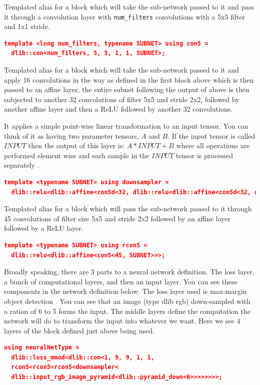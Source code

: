 \documentclass[a4paper, 12pt, oneside]{report}
\begin{document}
  Templated alias for a block which will take the sub-network passed to 
  it and pass it through a convolution layer with \texttt{num_filters} convolutions 
  with a 5x5 filter and 1x1 stride.
  
  \begin{lstlisting}[language=json,firstnumber=1]
  template <long num_filters, typename SUBNET> using con5 = 
  dlib::con<num_filters, 5, 5, 1, 1, SUBNET>;
  \end{lstlisting}
  
  Templated alias for a block which will take the sub-network passed to it
  and apply 16 convolutions in the way as defined in the first block above
  which is then passed to an affine layer, the entire subnet following the 
  output of above is then subjected to another 32 convolutions of filter 
  5x5 and stride 2x2, followed by another affine layer and then a ReLU \cite{RectifierneuralnetworksWikipedia-2020-02-10} 
  followed by another 32 convolutions.  
  
  It applies a simple point-wise linear transformation to an input tensor.  
  You can think of it as having two parameter tensors, $A$ and $B$.  If the 
  input tensor is called $INPUT$ then the output of this layer is:
  $A*INPUT+B$
  where all operations are performed element wise and each sample in the
  $INPUT$ tensor is processed separately \cite{dlibCLibrarylayersabstracth-2019-12-14}.
  
  \begin{lstlisting}[language=json,firstnumber=1]
  template <typename SUBNET> using downsampler = 
  dlib::relu<dlib::affine<con5d<32, dlib::relu<dlib::affine<con5d<32, dlib::relu<dlib::affine<con5d<16, SUBNET>>>>>>>>>;
  \end{lstlisting}
 
  Templated alias for a block which will pass the sub-network passed to it
  through 45 convolutions of filter size 5x5 and stride 2x2 followed 
  by an affine layer followed by a ReLU layer.
  \begin{lstlisting}[language=json,firstnumber=1]
  template <typename SUBNET> using rcon5 = 
  dlib::relu<dlib::affine<con5<45, SUBNET>>>;
  \end{lstlisting}
  
  Broadly speaking, there are 3 parts to a neural network definition.  
  The loss layer, a bunch of computational layers, and then an input layer. 
  You can see these components in the network definition below.
  The loss layer used is max-margin object detection \cite{king2015max}. You can see that an
  image (type dlib rgb) down-sampled with a ration of 6 to 5 forms the input.  
  The middle layers define the computation the network will do to transform the
  input into whatever we want. Here we see 4 layers of the block defined just above 
  being used.
  \begin{lstlisting}[language=json,firstnumber=1]
  using neuralNetType = 
  dlib::loss_mmod<dlib::con<1, 9, 9, 1, 1, 
  rcon5<rcon5<rcon5<downsampler<
  dlib::input_rgb_image_pyramid<dlib::pyramid_down<6>>>>>>>>;
  \end{lstlisting}
  
\end{document}
